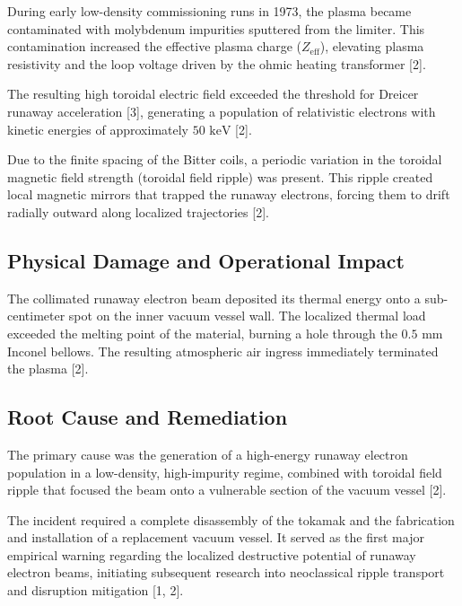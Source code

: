 \documentclass[11pt,a4paper]{article}
\begin{document}
During early low-density commissioning runs in 1973, the plasma became contaminated with molybdenum impurities sputtered from the limiter. This contamination increased the effective plasma charge (\(Z_{\text{eff}}\)), elevating plasma resistivity and the loop voltage driven by the ohmic heating transformer {[}2{]}.

The resulting high toroidal electric field exceeded the threshold for Dreicer runaway acceleration {[}3{]}, generating a population of relativistic electrons with kinetic energies of approximately \(50\text{ keV}\) {[}2{]}.

Due to the finite spacing of the Bitter coils, a periodic variation in the toroidal magnetic field strength (toroidal field ripple) was present. This ripple created local magnetic mirrors that trapped the runaway electrons, forcing them to drift radially outward along localized trajectories {[}2{]}.

\hypertarget{physical-damage-and-operational-impact}{%
\subsection{Physical Damage and Operational Impact}\label{physical-damage-and-operational-impact}}

The collimated runaway electron beam deposited its thermal energy onto a sub-centimeter spot on the inner vacuum vessel wall. The localized thermal load exceeded the melting point of the material, burning a hole through the \(0.5\text{ mm}\) Inconel bellows. The resulting atmospheric air ingress immediately terminated the plasma {[}2{]}.

\hypertarget{root-cause-and-remediation}{%
\subsection{Root Cause and Remediation}\label{root-cause-and-remediation}}

The primary cause was the generation of a high-energy runaway electron population in a low-density, high-impurity regime, combined with toroidal field ripple that focused the beam onto a vulnerable section of the vacuum vessel {[}2{]}.

The incident required a complete disassembly of the tokamak and the fabrication and installation of a replacement vacuum vessel. It served as the first major empirical warning regarding the localized destructive potential of runaway electron beams, initiating subsequent research into neoclassical ripple transport and disruption mitigation {[}1, 2{]}.
\end{document}
